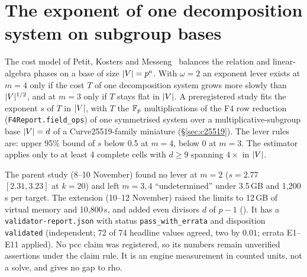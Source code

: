 \section{The exponent of one decomposition system on subgroup bases}\label{sec:fe-exponent}

The cost model of Petit, Kosters and Messeng~\cite{pkm2016} balances the
relation and linear-algebra phases on a base of size $\lvert V \rvert=p^a$. With
$\omega=2$ an exponent lever exists at $m=4$ only if the cost $T$ of one
decomposition system grows more slowly than $\lvert V \rvert^{1/2}$, and at $m=3$
only if $T$ stays flat in $\lvert V \rvert$. A preregistered study fits the exponent
$s$ of $T$ in $\lvert V \rvert$, with $T$ the $\mathbb{F}_p$ multiplications of the F4 row
reduction (\texttt{F4Report.field\_ops}) of one symmetrised system over a
multiplicative-subgroup base $\lvert V \rvert=d$ of a Curve25519-family miniature
(\S\ref{sec:c25519}). The lever rules are: upper 95\% bound of $s$ below
0.5 at $m=4$, below 0 at $m=3$. The estimator applies only to at least 4
complete cells with $d\ge9$ spanning $4\times$ in $\lvert V \rvert$.

The parent study (8--10 November) found no lever at $m=2$ ($s=2.77$
$[2.31,3.23]$ at $k=20$) and left $m=3,4$ ``undetermined'' under 3.5\,GB
and 1{,}200\,s per target. The extension (10--12 November) raised the
limits to 12\,GB of virtual memory and 10{,}800\,s, and added even divisors
$d$ of $p-1$ ().
It has a \texttt{validator-report.json} with status \texttt{pass\_with\_errata} and
disposition \texttt{validated} (independent; 72 of 74 headline values
agreed, two by $0.01$; errata E1--E11 applied). No pcc claim was
registered, so its numbers remain unverified assertions under the claim
rule. It is an engine measurement in counted units, not a solve, and gives
no gap to rho.


